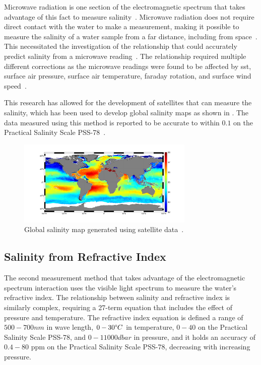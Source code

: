 Microwave radiation is one section of the electromagnetic spectrum that takes advantage of this fact to measure salinity~\cite{swift_considerations_for_microwave_salinity_1983}.
Microwave radiation does not require direct contact with the water to make a measurement, making it possible to measure the salinity of a water sample from a far distance, including from space~\cite{gabarro_microwave_salinity_2004}.
This necessitated the investigation of the relationship that could accurately predict salinity from a microwave reading~\cite{gabarro_microwave_salinity_2004}.
The relationship required multiple different corrections as the microwave readings were found to be affected by \gls{sst}, surface air pressure, surface air temperature, faraday rotation, and surface wind speed~\cite{yueh_microwave_salinity_error_sources_2001}.

This research has allowed for the development of satellites that can measure the salinity, which has been used to develop global salinity maps as shown in .
The data measured using this method is reported to be accurate to within $0.1$ on the Practical Salinity Scale PSS-78~\cite{yueh_microwave_salinity_error_sources_2001}.
\begin{figure}[ht]
    \centering
    \includegraphics[width=0.75\textwidth]{Figures/salinity_distribution}
    \caption{Global salinity map generated using satellite data~\cite{esa_mapping_salty_waters_2019}.}
    \label{fig:satellite_salinity_map} %
\end{figure}

\subsection{Salinity from Refractive Index}

The second measurement method that takes advantage of the electromagnetic spectrum interaction uses the visible light spectrum to measure the water's refractive index.
The relationship between salinity and refractive index is similarly complex, requiring a 27-term equation that includes the effect of pressure and temperature.
The refractive index equation is defined a range of $500-700nm$ in wave length, $0-30\degree C$ in temperature, $0-40$ on the Practical Salinity Scale PSS-78, and $0-11000 dbar$ in pressure, and it holds an accuracy of $0.4-80$ \gls{ppm} on the Practical Salinity Scale PSS-78, decreasing with increasing pressure.~\cite{millard_index_of_refraction_algorithm_1990}

